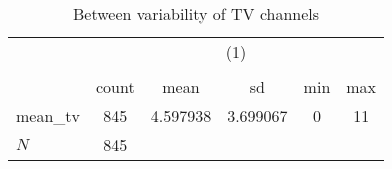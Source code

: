 \begin{table}[htbp]\centering
\def\sym#1{\ifmmode^{#1}\else\(^{#1}\)\fi}
\caption{Between variability of TV channels\label{tab3}}
\begin{tabular}{l*{1}{ccccc}}
\hline\hline
            &\multicolumn{5}{c}{(1)}                                         \\
            &\multicolumn{5}{c}{}                                            \\
            &       count&        mean&          sd&         min&         max\\
\hline
mean\_tv     &         845&    4.597938&    3.699067&           0&          11\\
\hline
\(N\)       &         845&            &            &            &            \\
\hline\hline
\end{tabular}
\end{table}
